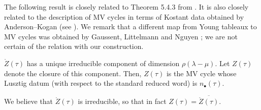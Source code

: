 \documentclass{article}
\begin{document}
The following result is closely related to  Theorem 5.4.3 from \cite{dthesis}. It is also closely related to the description of MV cycles in terms of Kostant data obtained by Anderson--Kogan \cite{anderson2004mirkovic} (see \cite[Section 9]{kamnitzer2010mirkovic}).  
We remark that a different map from Young tableaux to MV cycles was obtained by Gaussent, Littelmann and Nguyen \cite[Theorem 2]{gaussent2013knuth}; we are not certain of the relation with our construction. 

\begin{proposition}\label{pr:newmvdes}
    $ \mathring Z(\tau)$ has a unique irreducible component of dimension $ \rho(\lambda - \mu)$.  Let $ Z(\tau)$ denote the closure of this component.  Then, 
    $Z(\tau)$ is the MV cycle whose Lusztig datum (with respect to the standard reduced word) is $n_\bullet(\tau)$. 
\end{proposition}
% 
\begin{remark}\label{rem:irreducible}
We believe that $ \mathring Z(\tau)$ is irreducible, so that in fact $ Z(\tau) = \overline{ \mathring Z(\tau)}$.
\end{remark}
\end{document}
